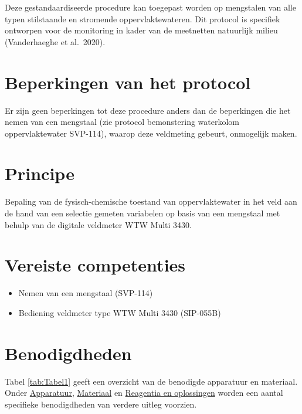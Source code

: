 \documentclass[
]{scrreprt}
\begin{document}
Deze gestandaardiseerde procedure kan toegepast worden op mengstalen van alle typen stilstaande en stromende oppervlaktewateren.
Dit protocol is specifiek ontworpen voor de monitoring in kader van de meetnetten natuurlijk milieu (Vanderhaeghe et al.~2020).

\hypertarget{beperkingen-van-het-protocol}{%
\chapter{Beperkingen van het protocol}\label{beperkingen-van-het-protocol}}

Er zijn geen beperkingen tot deze procedure anders dan de beperkingen die het nemen van een mengstaal (zie protocol bemonstering waterkolom oppervlaktewater SVP-114\href{}{}), waarop deze veldmeting gebeurt, onmogelijk maken.

\hypertarget{principe}{%
\chapter{Principe}\label{principe}}

Bepaling van de fysisch-chemische toestand van oppervlaktewater in het veld aan de hand van een selectie gemeten variabelen op basis van een mengstaal met behulp van de digitale veldmeter WTW Multi 3430.

\hypertarget{vereiste-competenties}{%
\chapter{Vereiste competenties}\label{vereiste-competenties}}

\begin{itemize}
\item
  Nemen van een mengstaal (SVP-114)
\item
  Bediening veldmeter type WTW Multi 3430 (SIP-055B)
\end{itemize}

\hypertarget{benodigdheden}{%
\chapter{Benodigdheden}\label{benodigdheden}}

Tabel \ref{tab:Tabel1} geeft een overzicht van de benodigde apparatuur en materiaal.
Onder \protect\hyperlink{apparatuur}{Apparatuur}, \protect\hyperlink{materiaal}{Materiaal} en \protect\hyperlink{reagentia}{Reagentia en oplossingen} worden een aantal specifieke benodigdheden van verdere uitleg voorzien.
\end{document}

